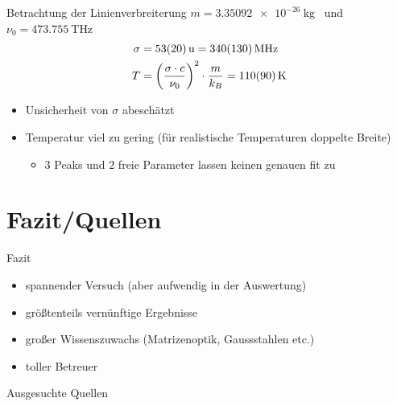 \documentclass[10pt, aspectratio=169]{beamer}
\begin{document}
\begin{frame}{Betrachtung der Linienverbreiterung}
  \(m=\SI{3.35092e-26}{\kg}\)~\cite{IUPAC2013} und
  \(\nu_0=\SI{473.755}{\tera\hertz}\) ~\cite[226]{Sigrist2018}
  \begin{align}
    \sigma & = \SI{53\pm 20}{u} = \SI{340\pm 130}{\mega\hertz} \\
    T & = \qty(\frac{\sigma\cdot c}{\nu_0})^2\cdot \frac{m}{k_B}=\SI{110\pm 90}{\kelvin}
  \end{align}
  \begin{itemize}
  \item<1-> Unsicherheit von \(\sigma\) abesch\"atzt
  \item<2-> Temperatur viel zu gering (f\"ur realistische Temperaturen
    doppelte Breite)
    \begin{itemize}
    \item \(3\) Peaks und \(2\) freie Parameter lassen keinen genauen
      fit zu
    \end{itemize}
  \end{itemize}
   
\end{frame}




\section{Fazit/Quellen}

\begin{frame}{Fazit}
  \begin{itemize}
  \item<1-> spannender Versuch (aber aufwendig in der Auswertung)
  \item<2-> gr\"o\ss{}tenteils vern\"unftige Ergebnisse
  \item<3-> gro\ss{}er Wissenszuwachs (Matrizenoptik, Gaussstahlen
    etc.)
  \item<4-> toller Betreuer
  \end{itemize}
\end{frame}
\begin{frame}[allowframebreaks]{Ausgesuchte Quellen}
  \printbibliography
\end{frame}
\end{document}
